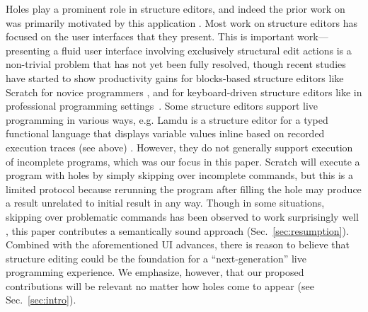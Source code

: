 Holes play a prominent role in structure editors, and indeed the prior work on \Hazelnut was primarily motivated by this application \cite{popl-paper}. 
Most work on structure editors has focused on the user interfaces that they
present. This is important work---presenting a fluid user interface involving
exclusively structural edit actions is a non-trivial problem that has not yet
been fully resolved, though recent studies have started to show productivity
gains for blocks-based structure editors like Scratch for novice programmers \cite{Resnick:2009:SP:1592761.1592779,DBLP:conf/chi/WeintropASFLSF18,DBLP:conf/acmidc/WeintropW15}, and for keyboard-driven structure
editors like  in professional programming settings~\cite{DBLP:conf/vl/Asenov014,DBLP:conf/sle/VolterSBK14,voelter_mbeddr:_2012}.
%
Some structure editors support live programming in various ways, e.g. Lamdu is a structure editor for a typed functional language that displays variable values inline based on recorded execution traces (see above) \cite{lamdu}. However, they do not generally support execution of incomplete programs, which was our focus in this paper. Scratch will execute a program with holes by simply skipping over incomplete commands, but this is a limited protocol because rerunning the program after filling the hole may produce a result unrelated to initial result in any way. Though in some situations, skipping over problematic commands has been observed to work surprisingly well \cite{DBLP:conf/dac/Rinard12}, this paper contributes a semantically sound approach (Sec.~\ref{sec:resumption}). Combined with the aforementioned UI advances, there is reason to believe that structure editing could be the foundation for a ``next-generation'' live programming experience. We emphasize, however,   
that our proposed contributions will be relevant no matter how holes come to appear (see Sec.~\ref{sec:intro}). %




